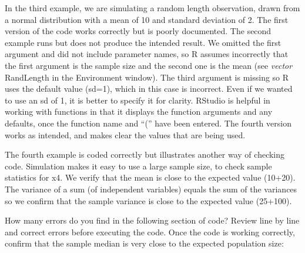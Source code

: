 \documentclass[
]{krantz}
\begin{document}
In the third example, we are simulating a random length observation, drawn from a normal distribution with a mean of 10 and standard deviation of 2. The first version of the code works correctly but is poorly documented. The second example runs but does not produce the intended result. We omitted the first argument and did not include parameter names, so R assumes incorrectly that the first argument is the sample size and the second one is the mean (see \emph{vector} RandLength in the Environment window). The third argument is missing so R uses the default value (sd=1), which in this case is incorrect. Even if we wanted to use an sd of 1, it is better to specify it for clarity. RStudio is helpful in working with functions in that it displays the function arguments and any defaults, once the function name and ``('' have been entered. The fourth version works as intended, and makes clear the values that are being used.

The fourth example is coded correctly but illustrates another way of checking code. Simulation makes it easy to use a large sample size, to check sample statistics for x4. We verify that the mean is close to the expected value (10+20). The variance of a sum (of independent variables) equals the sum of the variances so we confirm that the sample variance is close to the expected value (25+100).

How many errors do you find in the following section of code? Review line by line and correct errors before executing the code. Once the code is working correctly, confirm that the sample median is very close to the expected population size:
\end{document}

